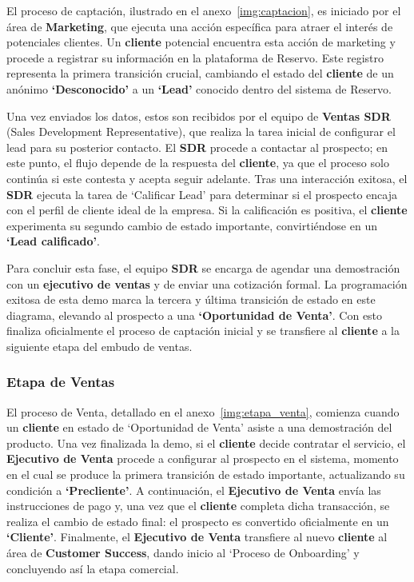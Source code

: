 El proceso de captación, ilustrado en el anexo~\ref{img:captacion}, es iniciado por el área de \textbf{Marketing}, que ejecuta una acción específica para atraer el interés de potenciales clientes. Un \textbf{cliente} potencial encuentra esta acción de marketing y procede a registrar su información en la plataforma de Reservo. Este registro representa la primera transición crucial, cambiando el estado del \textbf{cliente} de un anónimo \textbf{`Desconocido'} a un \textbf{`Lead'} conocido dentro del sistema de Reservo.

Una vez enviados los datos, estos son recibidos por el equipo de \textbf{Ventas SDR} (Sales Development Representative), que realiza la tarea inicial de configurar el lead para su posterior contacto. El \textbf{SDR} procede a contactar al prospecto; en este punto, el flujo depende de la respuesta del \textbf{cliente}, ya que el proceso solo continúa si este contesta y acepta seguir adelante. Tras una interacción exitosa, el \textbf{SDR} ejecuta la tarea de `Calificar Lead' para determinar si el prospecto encaja con el perfil de cliente ideal de la empresa. Si la calificación es positiva, el \textbf{cliente} experimenta su segundo cambio de estado importante, convirtiéndose en un \textbf{`Lead calificado'}.

Para concluir esta fase, el equipo \textbf{SDR} se encarga de agendar una demostración con un \textbf{ejecutivo de ventas} y de enviar una cotización formal. La programación exitosa de esta demo marca la tercera y última transición de estado en este diagrama, elevando al prospecto a una \textbf{`Oportunidad de Venta'}. Con esto finaliza oficialmente el proceso de captación inicial y se transfiere al \textbf{cliente} a la siguiente etapa del embudo de ventas.

\subsubsection{Etapa de Ventas}

El proceso de Venta, detallado en el anexo~\ref{img:etapa_venta}, comienza cuando un \textbf{cliente} en estado de `Oportunidad de Venta' asiste a una demostración del producto. Una vez finalizada la demo, si el \textbf{cliente} decide contratar el servicio, el \textbf{Ejecutivo de Venta} procede a configurar al prospecto en el sistema, momento en el cual se produce la primera transición de estado importante, actualizando su condición a \textbf{`Precliente'}. A continuación, el \textbf{Ejecutivo de Venta} envía las instrucciones de pago y, una vez que el \textbf{cliente} completa dicha transacción, se realiza el cambio de estado final: el prospecto es convertido oficialmente en un \textbf{`Cliente'}. Finalmente, el \textbf{Ejecutivo de Venta} transfiere al nuevo \textbf{cliente} al área de \textbf{Customer Success}, dando inicio al `Proceso de Onboarding' y concluyendo así la etapa comercial.

